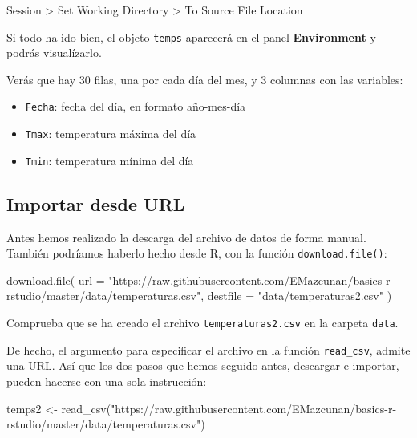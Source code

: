 \documentclass[
  title=normal,
  notoc,
  bib=normal]{mnye}
\newenvironment{Shaded}{\begin{snugshade}}{\end{snugshade}}
\newcommand{\AttributeTok}[1]{\textcolor[rgb]{0.77,0.63,0.00}{#1}}
\newcommand{\FunctionTok}[1]{\textcolor[rgb]{0.00,0.00,0.00}{#1}}
\newcommand{\NormalTok}[1]{#1}
\newcommand{\OtherTok}[1]{\textcolor[rgb]{0.56,0.35,0.01}{#1}}
\newcommand{\StringTok}[1]{\textcolor[rgb]{0.31,0.60,0.02}{#1}}
\providecommand{\tightlist}{%
  \setlength{\itemsep}{0pt}\setlength{\parskip}{0pt}}
\begin{document}
Session \textgreater{} Set Working Directory \textgreater{} To Source File Location

Si todo ha ido bien, el objeto \texttt{temps} aparecerá en el panel \textbf{Environment} y podrás visualízarlo.

Verás que hay \(30\) filas, una por cada día del mes, y \(3\) columnas con las variables:

\begin{itemize}
\tightlist
\item
  \texttt{Fecha}: fecha del día, en formato año-mes-día
\item
  \texttt{Tmax}: temperatura máxima del día
\item
  \texttt{Tmin}: temperatura mínima del día
\end{itemize}

\hypertarget{importar-desde-url}{%
\subsection{Importar desde URL}\label{importar-desde-url}}

Antes hemos realizado la descarga del archivo de datos de forma manual. También podríamos haberlo hecho desde \textsf{R}, con la función \texttt{download.file()}:

\begin{Shaded}
\begin{Highlighting}[]
\FunctionTok{download.file}\NormalTok{(}
    \AttributeTok{url =} \StringTok{"https://raw.githubusercontent.com/EMazcunan/basics{-}r{-}rstudio/master/data/temperaturas.csv"}\NormalTok{,}
    \AttributeTok{destfile =} \StringTok{"data/temperaturas2.csv"}
\NormalTok{)}
\end{Highlighting}
\end{Shaded}

Comprueba que se ha creado el archivo \texttt{temperaturas2.csv} en la carpeta \texttt{data}.

De hecho, el argumento para especificar el archivo en la función \texttt{read\_csv}, admite una URL. Así que los dos pasos que hemos seguido antes, descargar e importar, pueden hacerse con una sola instrucción:

\begin{Shaded}
\begin{Highlighting}[]
\NormalTok{temps2 }\OtherTok{\textless{}{-}} \FunctionTok{read\_csv}\NormalTok{(}\StringTok{"https://raw.githubusercontent.com/EMazcunan/basics{-}r{-}rstudio/master/data/temperaturas.csv"}\NormalTok{)}
\end{Highlighting}
\end{Shaded}
\end{document}
